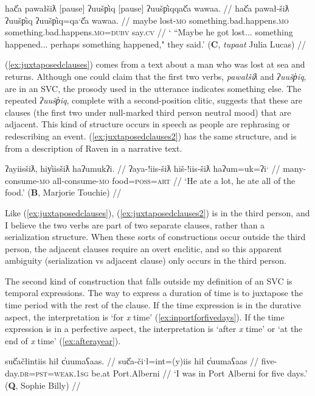 \ex \label{ex:juxtaposedclauses}
\begingl
\glpreamble hač̓a pawałšiƛ [pause] ʔuušp̓iq [pause] ʔuušp̓iqqač̓a wawaa. //
\gla hač̓a pawał-šiƛ ʔuušp̓iq ʔuušp̓iq=qaˑč̓a wawaa. //
\glb maybe lost-\textsc{mo} something.bad.happens.\textsc{mo} something.bad.happens.\textsc{mo}=\textsc{dubv} say.\textsc{cv} //
\glft ` ``Maybe he got lost... something happened... perhaps something happened," they said.' (\textbf{C}, \textit{tupaat} Julia Lucas) //
\endgl
\xe

(\ref{ex:juxtaposedclauses}) comes from a text about a man who was lost at sea and returns. Although one could claim that the first two verbs, \textit{pawałšiƛ} and \textit{ʔuušp̓iq}, are in an SVC, the prosody used in the utterance indicates something else. The repeated \textit{ʔuušp̓iq}, complete with a second-position clitic, suggests that these are clauses (the first two under null-marked third person neutral mood) that are adjacent. This kind of structure occurs in speech as people are rephrasing or redescribing an event. (\ref{ex:juxtaposedclauses2}) has the same structure, and is from a description of Raven in a narrative text.

\ex \label{ex:juxtaposedclauses2}
\begingl
\glpreamble ʔayiisšiƛ, hiy̓iisšiƛ haʔumukʔi. //
\gla ʔaya-!iis-šiƛ hiš-!iis-šiƛ haʔum=uk=ʔiˑ //
\glb many-consume-\textsc{mo} all-consume-\textsc{mo} food=\textsc{poss}=\textsc{art} //
\glft `He ate a lot, he ate all of the food.' (\textbf{B}, Marjorie Touchie) //
\endgl
\xe

Like (\ref{ex:juxtaposedclauses}), (\ref{ex:juxtaposedclauses2}) is in the third person, and I believe the two verbs are part of two separate clauses, rather than a serialization structure. When these sorts of constructions occur outside the third person, the adjacent clauses require an overt enclitic, and so this apparent ambiguity (serialization vs adjacent clause) only occurs in the third person.

The second kind of construction that falls outside my definition of an SVC is temporal expressions. The way to express a duration of time is to juxtapose the time period with the rest of the clause. If the time expression is in the durative aspect, the interpretation is `for \textit{x} time' (\ref{ex:inportforfivedays}). If the time expression is in a perfective aspect, the interpretation is `after \textit{x} time' or `at the end of \textit{x} time' (\ref{ex:afterayear}).

\ex \label{ex:inportforfivedays}
\begingl
\glpreamble suč̓ačłintiis hił c̓uumaʕaas. //
\gla suč̓a-čiˑł=int=(y)iis hił c̓uumaʕaas //
\glb five-day.\textsc{dr}=\textsc{pst}=\textsc{weak.1sg} be.at Port.Alberni //
\glft `I was in Port Alberni for five days.' (\textbf{Q}, Sophie Billy) //
\endgl
\xe

